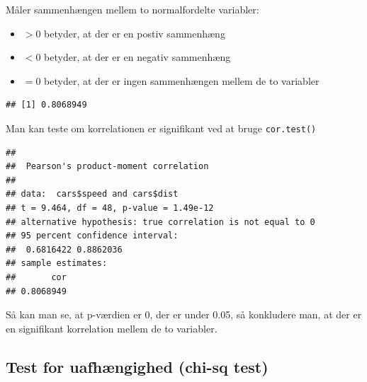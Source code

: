 \documentclass[
]{book}
\newenvironment{Shaded}{\begin{snugshade}}{\end{snugshade}}
\newcommand{\FunctionTok}[1]{\textcolor[rgb]{0.00,0.00,0.00}{#1}}
\newcommand{\NormalTok}[1]{#1}
\newcommand{\SpecialCharTok}[1]{\textcolor[rgb]{0.00,0.00,0.00}{#1}}
\providecommand{\tightlist}{%
  \setlength{\itemsep}{0pt}\setlength{\parskip}{0pt}}
\begin{document}
Måler sammenhængen mellem to normalfordelte variabler:

\begin{itemize}
\tightlist
\item
  \(>0\) betyder, at der er en postiv sammenhæng
\item
  \(<0\) betyder, at der er en negativ sammenhæng
\item
  \(=0\) betyder, at der er ingen sammenhængen mellem de to variabler
\end{itemize}

\begin{Shaded}
\end{Shaded}

\begin{verbatim}
## [1] 0.8068949
\end{verbatim}

Man kan teste om korrelationen er signifikant ved at bruge \texttt{cor.test()}

\begin{Shaded}
\end{Shaded}

\begin{verbatim}
## 
##  Pearson's product-moment correlation
## 
## data:  cars$speed and cars$dist
## t = 9.464, df = 48, p-value = 1.49e-12
## alternative hypothesis: true correlation is not equal to 0
## 95 percent confidence interval:
##  0.6816422 0.8862036
## sample estimates:
##       cor 
## 0.8068949
\end{verbatim}

Så kan man se, at p-værdien er 0, der er under 0.05, så konkludere man, at der er en signifikant korrelation mellem de to variabler.

\hypertarget{test-for-uafhuxe6ngighed-chi-sq-test}{%
\subsection{Test for uafhængighed (chi-sq test)}\label{test-for-uafhuxe6ngighed-chi-sq-test}}
\end{document}
